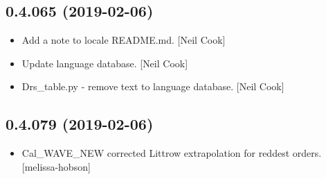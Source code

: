 \documentclass[a4paper,10pt,english]{report}
\begin{document}
\subsection{0.4.065 (2019-02-06)}
\label{\detokenize{misc/changelog:id191}}\begin{itemize}
\item {} 
Add a note to locale README.md. {[}Neil Cook{]}

\item {} 
Update language database. {[}Neil Cook{]}

\item {} 
Drs\_table.py - remove text to language database. {[}Neil Cook{]}

\end{itemize}


\subsection{0.4.079 (2019-02-06)}
\label{\detokenize{misc/changelog:id192}}\begin{itemize}
\item {} 
Cal\_WAVE\_NEW corrected Littrow extrapolation for reddest orders.
{[}melissa-hobson{]}

\end{itemize}
\end{document}
